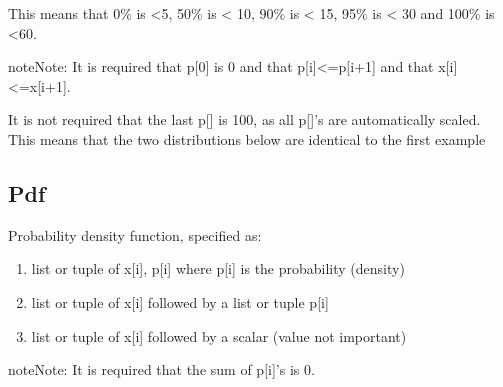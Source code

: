 \documentclass[letterpaper,10pt,english]{sphinxmanual}
\begin{document}
This means that 0\% is \textless{}5, 50\% is \textless{} 10, 90\% is \textless{} 15, 95\% is \textless{} 30 and 100\% is \textless{}60.

\begin{sphinxadmonition}{note}{Note:}
It is required that p{[}0{]} is 0 and that p{[}i{]}\textless{}=p{[}i+1{]} and that x{[}i{]}\textless{}=x{[}i+1{]}.
\end{sphinxadmonition}

It is not required that the last p{[}{]} is 100, as all p{[}{]}’s are automatically scaled. This means that the two distributions below are
identical to the first example

%
\begin{sphinxVerbatim}[commandchars=\\\{\}]
           
                      
\end{sphinxVerbatim}


\subsection{Pdf}
\label{\detokenize{Distributions:pdf}}
Probability density function, specified as:
\begin{enumerate}
\item {} 
list or tuple of x{[}i{]}, p{[}i{]} where p{[}i{]} is the probability (density)

\item {} 
list or tuple of x{[}i{]} followed by a list or tuple p{[}i{]}

\item {} 
list or tuple of x{[}i{]} followed by a scalar (value not important)

\end{enumerate}

\begin{sphinxadmonition}{note}{Note:}
It is required that the sum of p{[}i{]}’s is  0.
\end{sphinxadmonition}
\end{document}
